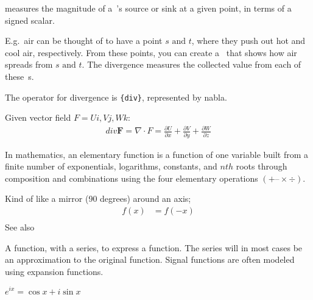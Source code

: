 \begin{definition}[Divergence]\label{divergence}
    measures the magnitude of a~'s source or sink at a
    given point, in terms of a signed scalar.

    E.g.\ air can be thought of to have a point $s \text{ and } t$, where they
    push out hot and cool air, respectively. From these points, you can create
    a~ that shows how air spreads from $s \text{ and }
    t$. The divergence measures the collected value from each of 
    these~s.

    The operator for divergence is \verb|{div}|, represented by nabla.

    Given vector field $F = Ui, Vj, Wk$:
    \begin{align}
            div \textbf{F} = \nabla \cdot F = 
            \frac{\partial{U}}{\partial{x}}+
            \frac{\partial{V}}{\partial{y}} +
            \frac{\partial{W}}{\partial{z}}
    \end{align}

\end{definition}

\begin{definition}
    In mathematics, an elementary function is a function of one variable built
    from a finite number of exponentials, logarithms, constants, and $nth$ roots
    through composition and combinations using the four elementary operations
    $(+ – × ÷)$.

\end{definition}

\begin{definition}\label{evenfunc}
    Kind of like a mirror (90 degrees) around an axis;
    \begin{align}
        f(x) &= f(-x) \\
    \end{align}
    See also~
\end{definition}


\begin{definition}
    A function, with a series, to express a function. The series will in
    most cases be an approximation to the original function.
    Signal functions are often modeled using expansion functions.
\end{definition}

\begin{definition}
    $e^{ix} = \cos{x} + i\sin{x}$
\end{definition}

